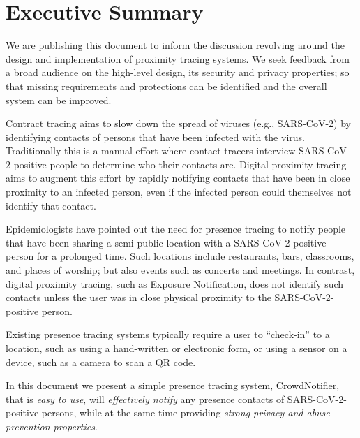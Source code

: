 \section*{Executive Summary}
We are publishing this document to inform the discussion revolving around the design and implementation of proximity tracing systems. We seek feedback from a broad audience on the high-level design, its security and privacy properties; so that missing requirements and protections can be identified and the overall system can be improved.

Contract tracing aims to slow down the spread of viruses (e.g., SARS-CoV-2) by identifying contacts of persons that have been infected with the virus. Traditionally this is a manual effort where contact tracers interview SARS-CoV-2-positive people to determine who their contacts are. Digital proximity tracing aims to augment this effort by rapidly notifying contacts that have been in close proximity to an infected person, even if the infected person could themselves not identify that contact.

Epidemiologists have pointed out the need for presence tracing to notify people that have been sharing a semi-public location with a SARS-CoV-2-positive person for a prolonged time. Such locations include restaurants, bars, classrooms, and places of worship; but also events such as concerts and meetings. In contrast, digital proximity tracing, such as Exposure Notification, does not identify such contacts unless the user was in close physical proximity to the SARS-CoV-2-positive person.

Existing presence tracing systems typically require a user to “check-in” to a location, such as using a hand-written or electronic form, or using a sensor on a device, such as a camera to scan a QR code. 

In this document we present a simple presence tracing system, CrowdNotifier,
that is \emph{easy to use}, will \emph{effectively notify} any presence contacts of SARS-CoV-2-positive persons, while at the same time providing \emph{strong privacy and abuse-prevention properties}.